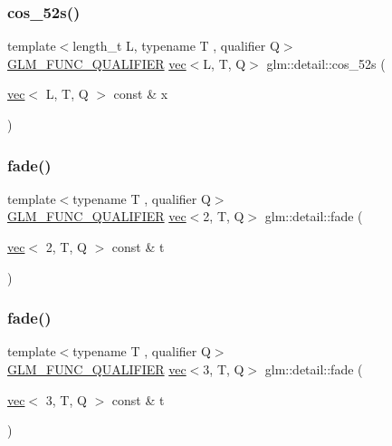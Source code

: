 \subsubsection{\texorpdfstring{cos\+\_\+52s()}{cos\_52s()}\hspace{0.1cm}{\footnotesize\ttfamily [2/2]}}
{\footnotesize\ttfamily template$<$length\+\_\+t L, typename T , qualifier Q$>$ \\
\hyperlink{setup_8hpp_a33fdea6f91c5f834105f7415e2a64407}{G\+L\+M\+\_\+\+F\+U\+N\+C\+\_\+\+Q\+U\+A\+L\+I\+F\+I\+ER} \hyperlink{structglm_1_1vec}{vec}$<$L, T, Q$>$ glm\+::detail\+::cos\+\_\+52s (\begin{DoxyParamCaption}\item[{\hyperlink{structglm_1_1vec}{vec}$<$ L, T, Q $>$ const \&}]{x }\end{DoxyParamCaption})}

\mbox{\label{namespaceglm_1_1detail_a4c0b9a9b95c2a1fead2e29b2538510cd}} 
\subsubsection{\texorpdfstring{fade()}{fade()}\hspace{0.1cm}{\footnotesize\ttfamily [1/3]}}
{\footnotesize\ttfamily template$<$typename T , qualifier Q$>$ \\
\hyperlink{setup_8hpp_a33fdea6f91c5f834105f7415e2a64407}{G\+L\+M\+\_\+\+F\+U\+N\+C\+\_\+\+Q\+U\+A\+L\+I\+F\+I\+ER} \hyperlink{structglm_1_1vec}{vec}$<$2, T, Q$>$ glm\+::detail\+::fade (\begin{DoxyParamCaption}\item[{\hyperlink{structglm_1_1vec}{vec}$<$ 2, T, Q $>$ const \&}]{t }\end{DoxyParamCaption})}

\mbox{\label{namespaceglm_1_1detail_afaca75ccf77b14b266db747f83adb11a}} 
\subsubsection{\texorpdfstring{fade()}{fade()}\hspace{0.1cm}{\footnotesize\ttfamily [2/3]}}
{\footnotesize\ttfamily template$<$typename T , qualifier Q$>$ \\
\hyperlink{setup_8hpp_a33fdea6f91c5f834105f7415e2a64407}{G\+L\+M\+\_\+\+F\+U\+N\+C\+\_\+\+Q\+U\+A\+L\+I\+F\+I\+ER} \hyperlink{structglm_1_1vec}{vec}$<$3, T, Q$>$ glm\+::detail\+::fade (\begin{DoxyParamCaption}\item[{\hyperlink{structglm_1_1vec}{vec}$<$ 3, T, Q $>$ const \&}]{t }\end{DoxyParamCaption})}

